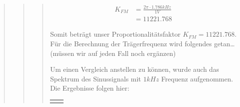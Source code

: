 \begin{quote}
\begin{quote}
\begin{quote}
\begin{equation*}
\begin{split}
	    K_{FM} &= \frac{2 \pi \cdot 1.786 kHz}{1 V}\\
	    	   &= 11221.768    		
       \end{split}
     \end{equation*}
        
        Somit beträgt unser Proportionalitätsfaktor $K_{FM} = 11221.768$.\\
        
        Für die Berechnung der Trägerfrequenz wird folgendes getan\ldots 
        (müssen wir auf jeden Fall noch ergänzen) 
        
        Um einen Vergleich anstellen zu können, wurde auch das Spektrum des
        Sinussignals mit $1 kHz$ Frequenz aufgenommen. Die Ergebnisse folgen
        hier:
        
                \begin{center}
            \begin{tabular}{ll}

            \hspace{-14em}
                \begin{minipage}{0.6\textwidth}


\end{minipage}
\end{tabular}
\end{center}
\end{quote}
\end{quote}
\end{quote}
